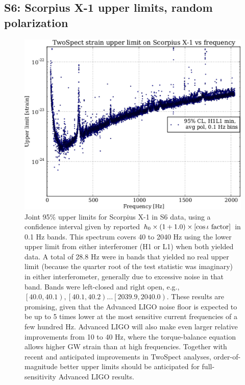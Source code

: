 \subsection{S6: Scorpius X-1 upper limits, random polarization}


\begin{figure}
\begin{center}
\includegraphics[width=0.68\paperwidth,height=0.48\paperheight]{plots/ScoX1ULs.eps}
\caption{
Joint 95\% upper limits for Scorpius X-1 in S6 data, using a confidence interval given by reported $h_0 \times \left( 1 + 1.0 \right) \times \left[\cos\iota \textup{ factor}\right]$ in 0.1 Hz bands. 
This spectrum covers 40 to 2040 Hz using the lower upper limit from either interferomer (H1 or L1) when both yielded data. 
A total of 28.8 Hz were in bands that yielded no real upper limit (because the quarter root of the test statistic was imaginary) in either interferometer, generally due to excessive noise in that band.
Bands were left-closed and right open, e.g., $\left[ 40.0,40.1\right), \left[ 40.1,40.2\right)\ldots \left[2039.9,2040.0\right)$.
These results are promising, given that the Advanced LIGO noise floor is expected to be up to 5 times lower at the most sensitive current frequencies of a few hundred Hz.
Advanced LIGO will also make even larger relative improvements from 10 to 40 Hz, where the torque-balance equation allows higher GW strain than at high frequencies.
Together with recent and anticipated improvements in TwoSpect analyses, order-of-magnitude better upper limits should be anticipated for full-sensitivity Advanced LIGO results.
}
\label{S6_H1L1_UL}
\end{center}
\end{figure}

